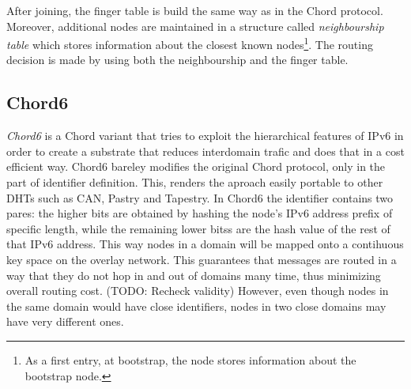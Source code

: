 \documentclass[a4paper,10pt]{article}
\begin{document}
After joining, the finger table is build the same way as in the Chord protocol. Moreover, additional nodes are maintained in a structure called \emph{neighbourship table} which stores information about the closest known nodes\footnote{As a first entry, at bootstrap, the node stores information about the bootstrap node.}. The routing decision is made by using both the neighbourship and the finger table.

\subsection{Chord6}
\emph{Chord6} \cite{xiong_chord6_2005} is a Chord variant that tries to exploit the hierarchical features of IPv6 in order to create a substrate that reduces interdomain trafic and does that in a cost efficient way. Chord6 bareley modifies the original Chord protocol, only in the part of identifier definition. This, renders the aproach easily portable to other DHTs such as CAN, Pastry and Tapestry. In Chord6 the identifier contains two pares: the higher bits are obtained by hashing the  node's IPv6 address prefix of specific length, while the remaining lower bitss are the hash value of the rest of that IPv6 address. This way nodes in a domain will be mapped onto a contihuous key space on the overlay network. This guarantees that messages are routed in a way that they do not hop in and out of domains many time, thus minimizing overall routing cost. (TODO: Recheck validity) However, even though nodes in the same domain would have close identifiers, nodes in two close domains may have very different ones.

\end{document}

